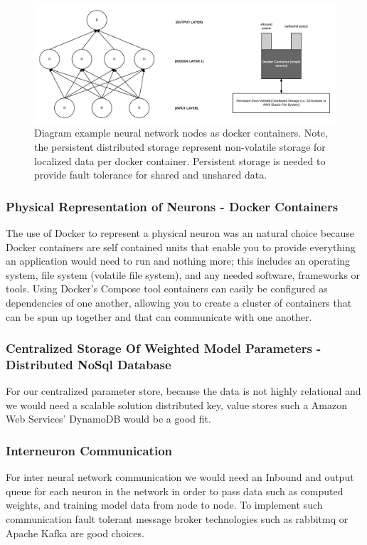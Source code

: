 \documentclass[conference]{IEEEtran}
\begin{document}
\begin{figure}
  \includegraphics[width=\textwidth]{ml_figure_draft.png}
  \caption{Diagram example neural network nodes as docker containers. Note, the persistent distributed storage represent non-volatile storage for localized data per docker container. Persistent storage is needed to provide fault tolerance for shared and unshared data.}
\end{figure}

\subsubsection{Physical Representation of Neurons - Docker Containers}
The use of Docker to represent a physical neuron was an natural choice because Docker containers are self contained units that enable you to provide everything an application would need to run and nothing more; this includes an operating system, file system (volatile file system), and any needed software, frameworks or tools. Using Docker's Compose tool \cite{docker-compose-doc} containers can easily be configured as dependencies of one another, allowing you to create a cluster of containers that can be spun up together and that can communicate with one another.

\subsubsection{Centralized Storage Of Weighted Model Parameters - Distributed NoSql Database}
For our centralized parameter store, because the data is not highly relational and we would need a scalable solution distributed key, value stores such a Amazon Web Services' DynamoDB would be a good fit.

\subsubsection{Interneuron Communication}
For inter neural network communication we would need an Inbound and output queue for each neuron in the network in order to pass data such as computed weights, and training model data from node to node. To implement such communication fault tolerant message broker technologies such as rabbitmq \cite{rabbitmq-doc} or Apache Kafka \cite{kafka-doc} are good choices.
\end{document}
